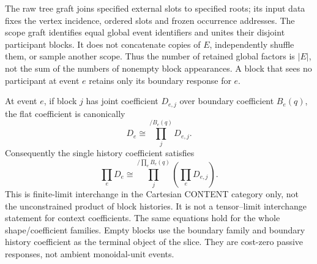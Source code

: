 \documentclass[11pt]{article}
\begin{document}
The raw tree graft joins specified external slots to specified roots; its input data fixes the vertex incidence, ordered slots and frozen occurrence addresses. The scope graft identifies equal global event identifiers and unites their disjoint participant blocks. It does not concatenate copies of $E$, independently shuffle them, or sample another scope. Thus the number of retained global factors is $|E|$, not the sum of the numbers of nonempty block appearances. A block that sees no participant at event $e$ retains only its boundary response for $e$.

At event $e$, if block $j$ has joint coefficient $D_{e,j}$ over boundary coefficient $B_e(q)$, the flat coefficient is canonically
\[
 D_e\cong\prod_j^{/B_e(q)}D_{e,j}.
\]
Consequently the single history coefficient satisfies
\[
 \prod_eD_e\cong
 \prod_j^{/\prod_e B_e(q)}\left(\prod_eD_{e,j}\right).
\]
This is finite-limit interchange in the Cartesian CONTENT category only, not the unconstrained product of block histories. It is not a tensor--limit interchange statement for context coefficients. The same equations hold for the whole shape/coefficient families. Empty blocks use the boundary family and boundary history coefficient as the terminal object of the slice. They are cost-zero passive responses, not ambient monoidal-unit events.
\end{document}
